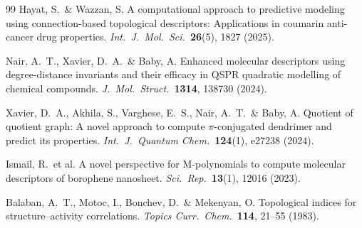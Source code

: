 \documentclass[12pt,a4paper]{article}
\begin{document}
\begin{thebibliography}{99}
Hayat, S.\ \& Wazzan, S.
A computational approach to predictive modeling using connection-based topological descriptors: Applications in coumarin anti-cancer drug properties.
\textit{Int.\ J.\ Mol.\ Sci.}\ \textbf{26}(5), 1827 (2025).

Nair, A.~T., Xavier, D.~A.\ \& Baby, A.
Enhanced molecular descriptors using degree-distance invariants and their efficacy in QSPR quadratic modelling of chemical compounds.
\textit{J.\ Mol.\ Struct.}\ \textbf{1314}, 138730 (2024).

Xavier, D.~A., Akhila, S., Varghese, E.~S., Nair, A.~T.\ \& Baby, A.
Quotient of quotient graph: A novel approach to compute $\pi$-conjugated dendrimer and predict its properties.
\textit{Int.\ J.\ Quantum Chem.}\ \textbf{124}(1), e27238 (2024).

Ismail, R.\ et al.
A novel perspective for M-polynomials to compute molecular descriptors of borophene nanosheet.
\textit{Sci.\ Rep.}\ \textbf{13}(1), 12016 (2023).

Balaban, A.~T., Motoc, I., Bonchev, D.\ \& Mekenyan, O.
Topological indices for structure--activity correlations.
\textit{Topics Curr.\ Chem.}\ \textbf{114}, 21--55 (1983).

\end{thebibliography}
\end{document}
